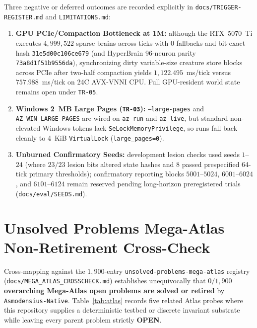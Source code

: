 \documentclass[11pt,reqno]{amsart}
\newcommand{\code}[1]{\texttt{\footnotesize #1}}
\newcommand{\us}{\_\allowbreak}
\newcommand{\slsh}{/\allowbreak}
\begin{document}
Three negative or deferred outcomes are recorded explicitly in \code{docs\slsh TRIGGER-REGISTER.md} and \code{LIMITATIONS.md}:
\begin{enumerate}[leftmargin=1.8em,itemsep=2pt]
  \item \textbf{GPU PCIe/Compaction Bottleneck at 1M:} although the RTX~5070~Ti executes $4{,}999{,}522$ sparse brains across ticks with $0$ fallbacks and bit-exact hash \code{31e5d00c106ce679} (and HyperBrain 96-neuron parity \code{73a8d1f51b9556da}), synchronizing dirty variable-size creature store blocks across PCIe after two-half compaction yields $1{,}122.495$~ms/tick versus $757.988$~ms/tick on 24C AVX-VNNI CPU. Full GPU-resident world state remains open under \code{TR-05}.
  \item \textbf{Windows 2~MB Large Pages (\code{TR-03}):} \code{--large-pages} and \code{AZ\us WIN\us LARGE\us PAGES} are wired on \code{az\us run} and \code{az\us live}, but standard non-elevated Windows tokens lack \code{SeLockMemoryPrivilege}, so runs fall back cleanly to 4~KiB \code{VirtualLock} (\code{large\us pages=0}).
  \item \textbf{Unburned Confirmatory Seeds:} development lesion checks used seeds $1$--$24$ (where $23/23$ lesion bits altered state hashes and $8$ passed prespecified 64-tick primary thresholds); confirmatory reporting blocks $5001$--$5024$, $6001$--$6024$, and $6101$--$6124$ remain reserved pending long-horizon preregistered trials (\code{docs\slsh eval\slsh SEEDS.md}).
\end{enumerate}

\section{Unsolved Problems Mega-Atlas Non-Retirement Cross-Check}

Cross-mapping against the $1{,}900$-entry \code{unsolved-problems-mega-atlas} registry (\code{docs\slsh MEGA\us ATLAS\us CROSSCHECK.md}) establishes unequivocally that \textbf{$0 / 1{,}900$ overarching Mega-Atlas open problems are solved or retired} by \code{Asmodensius-Native}. Table~\ref{tab:atlas} records five related Atlas probes where this repository supplies a deterministic testbed or discrete invariant substrate while leaving every parent problem strictly \textbf{OPEN}.
\end{document}
